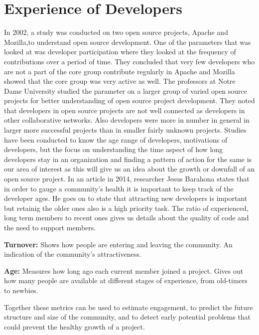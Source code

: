 \documentclass[seploa]{beavtex}
\begin{document}
\section{Experience of Developers}
In 2002, a study was conducted on two open source projects, Apache and Mozilla,to understand open source development. One of the parameters that was looked at was developer participation where they looked at the frequency of contributions over a period of time. They concluded that very few developers who are not a part of the core group contribute regularly in Apache and Mozilla showed that the core group was very active as well\cite{mockus2002}. The professors at Notre Dame University studied the parameter on a larger group of varied open source projects for better understanding of open source project development. They noted that developers in open source projects are not well connected as developers in other collaborative networks. Also developers were more in number in general in larger more successful projects than in smaller fairly unknown projects\cite{greg2002}. Studies have been conducted to know the age range of developers, motivations of developers, but the focus on understanding the time aspect of how long developers stay in an organization and finding a pattern of action for the same is our area of interest as this will give us an idea about the growth or downfall of an open source project. In an article in 2014, researcher Jesus Barahona states that in order to gauge a community's health it is important to keep track of the developer ages\cite{jes2014}. He goes on to state that attracting new developers is important but retainig the older ones also is a high priority task. The ratio of experienced, long term members to recent ones gives us details about the quality of code and the need to support members\cite{jes2014}.

\textbf{Turnover:}
Shows how people are entering and leaving the community. An indication of the community's attractiveness.

\textbf{Age:}
Measures how long ago each current member joined a project. Gives out how many people are available at different stages of experience, from old-timers to newbies.

Together these metrics can be used to estimate engagement, to predict the future structure and size of the community, and to detect early potential problems that could prevent the healthy growth of a project\cite{jes2014}.
\end{document}
